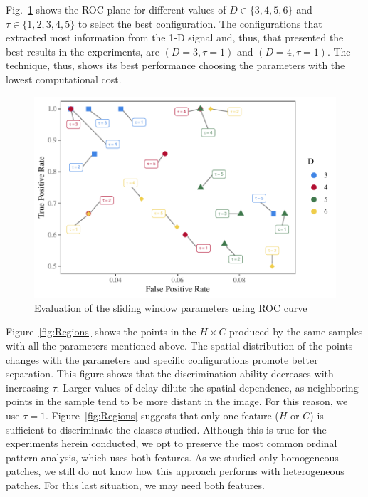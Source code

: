 Fig.~\ref{fig:ROC} shows the ROC plane for different values of $D \in \{3, 4, 5, 6 \} $ and $\tau \in \{1, 2, 3, 4, 5 \}$ to select the best configuration.
The configurations that extracted most information from the \mbox{1-D} signal and, thus, that presented the best results in the experiments, are $(D = 3, \tau = 1)$ and $(D = 4, \tau = 1)$.
The technique, thus, shows its best performance choosing the parameters with the lowest computational cost.

\begin{figure}
	\includegraphics[width=\columnwidth]{Figures/ROC.pdf}
	\caption{Evaluation of the sliding window parameters using ROC curve}
	\label{fig:ROC}
\end{figure} 

Figure~\ref{fig:Regions} shows the points in the $H\times C$ produced by the same samples with all the parameters mentioned above.
The spatial distribution of the points changes with the parameters and specific configurations promote better separation.
This figure shows that the discrimination ability decreases with increasing $\tau$.
Larger values of delay dilute the spatial dependence, as neighboring points in the sample tend to be more distant in the image.
For this reason, we use $\tau=1$. Figure~\ref{fig:Regions} suggests that only one feature ($H$ or $C$) is sufficient to discriminate the classes studied. Although this is true for the experiments herein conducted, we opt to preserve the most common ordinal pattern analysis, which uses both features. As we studied only homogeneous patches, we still do not know how this approach performs with heterogeneous patches. %
For this last situation, we may need both features.

